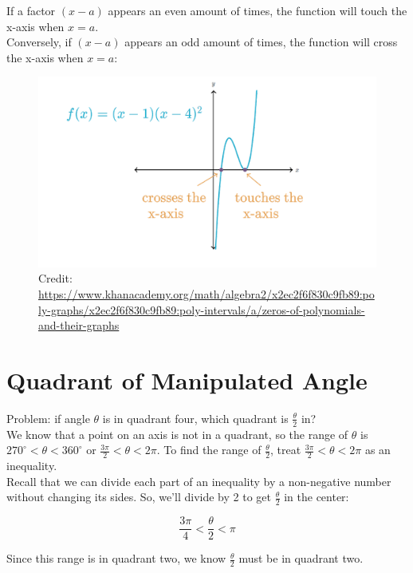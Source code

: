 \documentclass[12pt]{article}
\begin{document}
If a factor \((x-a)\) appears an even amount of times, the function will touch the x-axis when \(x=a\).\\

Conversely, if \((x-a)\) appears an odd amount of times, the function will cross the x-axis when \(x=a\):

\begin{figure}[H]
	\centering
	\includegraphics[scale=1]{Polynomial touching.png}
	\caption{Credit: \url{https://www.khanacademy.org/math/algebra2/x2ec2f6f830c9fb89:poly-graphs/x2ec2f6f830c9fb89:poly-intervals/a/zeros-of-polynomials-and-their-graphs}}
\end{figure}

\section{Quadrant of Manipulated Angle}

Problem: if angle \(\theta\) is in quadrant four, which quadrant is \(\frac{\theta}{2}\) in?\\

We know that a point on an axis is not in a quadrant, so the range of \(\theta\) is \(270^{\circ}<\theta<360^{\circ}\) or \(\frac{3\pi}{2}<\theta<2\pi\). To find the range of \(\frac{\theta}{2}\), treat \(\frac{3\pi}{2}<\theta<2\pi\) as an inequality. \\

Recall that we can divide each part of an inequality by a non-negative number without changing its sides. So, we'll divide by 2 to get \(\frac{\theta}{2}\) in the center:

\[\frac{3\pi}{4}<\frac{\theta}{2}<\pi\]

Since this range is in quadrant two, we know \(\frac{\theta}{2}\) must be in quadrant two.
\end{document}
